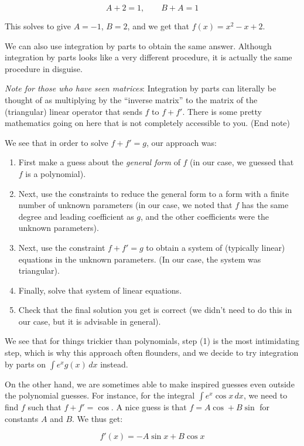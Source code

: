 \documentclass{amsart}
\begin{document}
$$A + 2 = 1, \qquad B + A = 1$$

This solves to give $A = -1$, $B = 2$, and we get that $f(x) = x^2 - x
+ 2$.

We can also use integration by parts to obtain the same
answer. Although integration by parts looks like a very different
procedure, it is actually the same procedure in disguise.

{\em Note for those who have seen matrices}: Integration by parts can
literally be thought of as multiplying by the ``inverse matrix'' to
the matrix of the (triangular) linear operator that sends $f$ to $f +
f'$. There is some pretty mathematics going on here that is not
completely accessible to you. (End note)

We see that in order to solve $f + f' = g$, our approach was:

\begin{enumerate}
\item First make a guess about the {\em general form} of $f$ (in our
  case, we guessed that $f$ is a polynomial).
\item Next, use the constraints to reduce the general form to a form
  with a finite number of unknown parameters (in our case, we noted
  that $f$ has the same degree and leading coefficient as $g$, and the
  other coefficients were the unknown parameters).
\item Next, use the constraint $f + f' = g$ to obtain a system of
  (typically linear) equations in the unknown parameters. (In our
  case, the system was triangular).
\item Finally, solve that system of linear equations.
\item Check that the final solution you get is correct (we didn't need
  to do this in our case, but it is advisable in general).
\end{enumerate}

We see that for things trickier than polynomials, step (1) is the most
intimidating step, which is why this approach often flounders, and we
decide to try integration by parts on $\int e^x g(x) \, dx$ instead.

On the other hand, we are sometimes able to make inspired guesses even
outside the polynomial guesses. For instance, for the integral $\int
e^x \cos x \, dx$, we need to find $f$ such that $f + f' = \cos$. A
nice guess is that $f = A \cos + B \sin$ for constants $A$ and $B$. We
thus get:

$$f'(x) = -A \sin x + B \cos x$$
\end{document}
